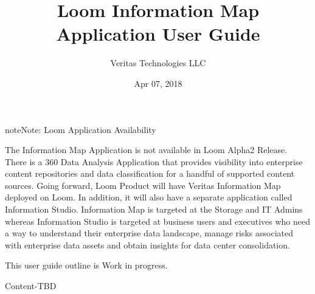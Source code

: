 \documentclass[letterpaper,10pt,english]{sphinxmanual}
\title{Loom Information Map Application User Guide}
\date{Apr 07, 2018}
\author{Veritas Technologies LLC}
\begin{document}
\maketitle
\sphinxtableofcontents
{}\label{\detokenize{appug/infomap_app_ug::doc}}


\begin{sphinxadmonition}{note}{Note:}
Loom Application Availability

The Information Map Application is not available in Loom Alpha2 Release. There is a 360 Data Analysis Application that provides visibility into enterprise content repositories and data classification for a handful of supported content sources.  Going forward, Loom Product will have Veritas Information Map deployed on Loom.  In addition, it will also have a separate application called Information Studio.  Information Map is targeted at the Storage and IT Admins whereas Information Studio is targeted at business users and executives who need a way to understand their enterprise data landscape, manage risks associated with enterprise data assets and obtain insights for data center consolidation.
\end{sphinxadmonition}

This user guide outline is Work in progress.

Content-TBD



\renewcommand{\indexname}{Index}
\printindex
\end{document}
